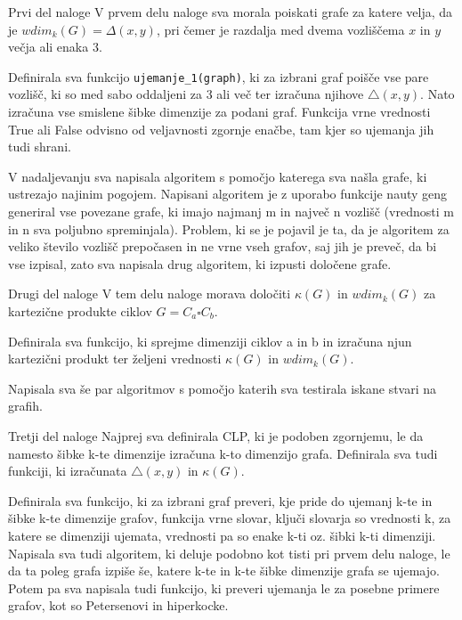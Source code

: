 \documentclass[12pt,a4paper]{amsart}
\makeatletter
\renewcommand\subsection{\@startsection{subsection}{2}%
  \z@{.5\linespacing\@plus.7\linespacing}{.5\linespacing}%
  {\normalfont\scshape}}
\theoremstyle{plain} %
\makeatother
\begin{document}
\subsection{Prvi del naloge}
V prvem delu naloge sva morala poiskati grafe za katere velja, da je  $wdim_k(G) = \Delta(x, y)$, 
pri čemer je razdalja med dvema vozliščema $x$ in $y$ večja ali enaka 3. 

Definirala sva funkcijo \verb|ujemanje_1(graph)|, ki za izbrani graf poišče vse pare vozlišč, ki so med sabo oddaljeni za
3 ali več ter izračuna njihove $\triangle(x,y)$. Nato izračuna vse smislene šibke dimenzije za podani graf.
Funkcija vrne vrednosti True ali False odvisno od veljavnosti zgornje enačbe, tam kjer so ujemanja jih tudi shrani.

V nadaljevanju sva napisala algoritem s pomočjo katerega sva našla grafe, ki ustrezajo najinim pogojem. 
Napisani algoritem je z uporabo funkcije nauty geng generiral vse povezane grafe, ki imajo najmanj m in največ n 
vozlišč (vrednosti m in n sva poljubno spreminjala). Problem, ki se je pojavil je ta, da je algoritem za veliko
število vozlišč prepočasen in ne vrne vseh grafov, saj jih je preveč, da bi vse izpisal, zato sva napisala 
drug algoritem, ki izpusti določene grafe.
\bigskip

\subsection{Drugi del naloge}
V tem delu naloge morava določiti $\kappa(G)$ in $wdim_k(G)$ za kartezične produkte ciklov $G = C_a \square C_b$.

Definirala sva funkcijo, ki sprejme dimenziji ciklov a in b in izračuna njun kartezični produkt ter željeni vrednosti 
$\kappa(G)$ in $wdim_k(G)$.

Napisala sva še par algoritmov s pomočjo katerih sva testirala iskane stvari na grafih.
\bigskip

\subsection{Tretji del naloge}
Najprej sva definirala CLP, ki je podoben zgornjemu, le da namesto šibke k-te dimenzije izračuna k-to dimenzijo grafa.
Definirala sva tudi funkciji, ki izračunata $\triangle(x,y)$ in $\kappa(G)$. 

Definirala sva funkcijo, ki za izbrani graf preveri, kje pride do ujemanj k-te in šibke k-te dimenzije grafov,
funkcija vrne slovar, ključi slovarja so vrednosti k, za katere se dimenziji ujemata, vrednosti pa so enake k-ti oz. šibki k-ti dimenziji.
Napisala sva tudi algoritem, ki deluje podobno kot tisti pri prvem delu naloge, le da ta poleg grafa
izpiše še, katere k-te in k-te šibke dimenzije grafa se ujemajo.
Potem pa sva napisala tudi funkcijo, ki preveri ujemanja le za posebne primere grafov, kot so Petersenovi in hiperkocke.
\end{document}

